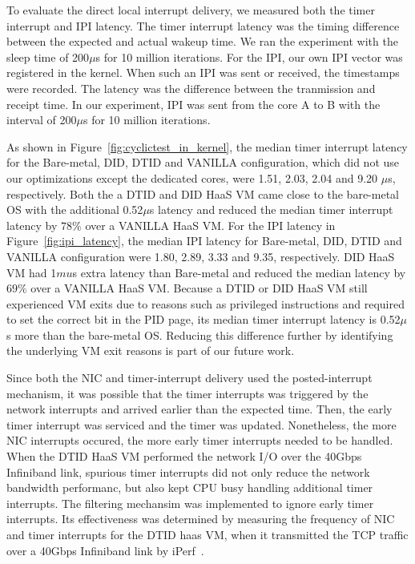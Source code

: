 To evaluate the direct local interrupt delivery, we measured
both the timer interrupt and IPI latency. The timer interrupt
latency was the timing difference between the expected and
actual wakeup time. We ran the experiment with the sleep time
of 200$\mu$s for 10 million iterations. For the IPI, our own
IPI vector was registered in the kernel. When such an IPI was
sent or received, the timestamps were recorded. The latency
was the difference between the tranmission and receipt time.
In our experiment, IPI was sent from the core A to B with the
interval of 200$\mu$s for 10 million iterations.

As shown in Figure~\ref{fig:cyclictest_in_kernel}, the median
timer interrupt latency for the Bare-metal, DID, DTID and
VANILLA configuration, which did not use our optimizations
except the dedicated cores, were 1.51, 2.03, 2.04 and 9.20
$\mu$s, respectively. Both the a DTID and DID HaaS VM came
close to the bare-metal OS with the additional 0.52$\mu$s
latency and reduced the median timer interrupt latency by
$78\%$ over a VANILLA HaaS VM. For the IPI latency in
Figure~\ref{fig:ipi_latency}, the median IPI latency for
Bare-metal, DID, DTID and VANILLA configuration were 1.80,
2.89, 3.33 and 9.35, respectively. DID HaaS VM had 1$mu$s
extra latency than Bare-metal and reduced the median latency
by $69\%$ over a VANILLA HaaS VM. Because a DTID or DID HaaS
VM still experienced VM exits due to reasons such as
privileged instructions and required to set the correct bit in
the PID page, its median timer interrupt latency is 0.52$\mu$s
more than the bare-metal OS. Reducing this difference further
by identifying the underlying VM exit reasons is part of our
future work.

Since both the NIC and timer-interrupt delivery used the
posted-interrupt mechanism, it was possible that the timer
interrupts was triggered by the network interrupts and arrived
earlier than the expected time. Then, the early timer
interrupt was serviced and the timer was updated. Nonetheless,
the more NIC interrupts occured, the more early timer
interrupts needed to be handled. When the DTID HaaS VM
performed the network I/O over the 40Gbps Infiniband link,
spurious timer interrupts did not only reduce the network
bandwidth performanc, but also kept CPU busy handling
additional timer interrupts. The filtering mechansim was
implemented to ignore early timer interrupts. Its
effectiveness was determined by measuring the frequency of NIC
and timer interrupts for the DTID haas VM, when it transmitted
the TCP traffic over a 40Gbps Infiniband link by
iPerf~\cite{iperf}.

